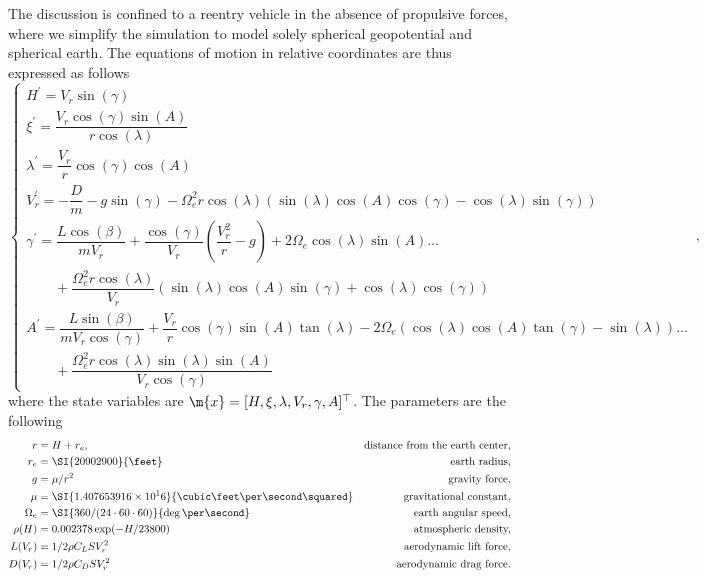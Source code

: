 The discussion is confined to a reentry vehicle in the absence of propulsive forces, where we simplify the simulation to model solely spherical geopotential and spherical earth. The equations of motion in relative coordinates are thus expressed as follows
%
\begin{equation}
  \begin{cases}
  H^{\prime}       = V_r\sin(\gamma) \\
  \xi^{\prime}     = \dfrac{V_r\cos(\gamma) \sin(A)}{r \cos(\lambda)} \\
  \lambda^{\prime} = \dfrac{V_r}{r} \cos(\gamma) \cos(A) \\
  V_r^{\prime}     = -\dfrac{D}{m} - g\sin(\gamma) - \Omega_e^2 r \cos(\lambda)(\sin(\lambda) \cos(A) \cos(\gamma)-\cos(\lambda) \sin(\gamma)) \\
  \gamma^{\prime}  = \dfrac{L\cos(\beta)}{m V_r}+\dfrac{\cos(\gamma)}{V_r}\left(\dfrac{V_r^2}{r}-g\right) + 2\Omega_e \cos(\lambda) \sin(A)\dots \\
  \qquad + \dfrac{\Omega_e^2 r \cos(\lambda)}{V_r}(\sin(\lambda) \cos(A) \sin(\gamma)+\cos(\lambda) \cos(\gamma)) \\
  A^{\prime}       = \dfrac{L\sin(\beta)}{m V_r \cos(\gamma)}+\dfrac{V_r}{r} \cos(\gamma) \sin(A) \tan(\lambda) - 2\Omega_e(\cos(\lambda) \cos(A) \tan(\gamma) - \sin(\lambda)) \dots \\
  \qquad + \dfrac{\Omega_e^2 r \cos(\lambda) \sin(\lambda) \sin(A)}{V_r \cos(\gamma)}
  \end{cases} \, \text{,}
  \label{chap5:eq:space_shuttle_reentry}
\end{equation}
%
where the state variables are $\m{x} = [H, \xi, \lambda, V_r, \gamma, A]^\top$. The parameters are the following
%
\begin{equation*}
  \begin{aligned}
    r           & = H + r_e, & \text{distance from the earth center,} \\
    r_e         & = \SI{20902900}{\feet} & \text{earth radius,} \\
    g           & = \mu/r^2 & \text{gravity force,} \\
    \mu         & = \SI{1.407653916\times 10^16}{\cubic\feet\per\second\squared} & \text{gravitational constant,} \\
    \Omega_e    & = \SI{360/(24\cdot60\cdot60)}{\deg\per\second} & \text{earth angular speed,} \\
    \rho(H)     & = 0.002378\exp(-H/23800) & \text{atmospheric density,} \\
    L(V_r)      & = 1/2 \rho C_L S V_r^2 & \text{aerodynamic lift force,} \\
    D(V_r)      & = 1/2 \rho C_D S V_r^2 & \text{aerodynamic drag force.}
  \end{aligned}
\end{equation*}
